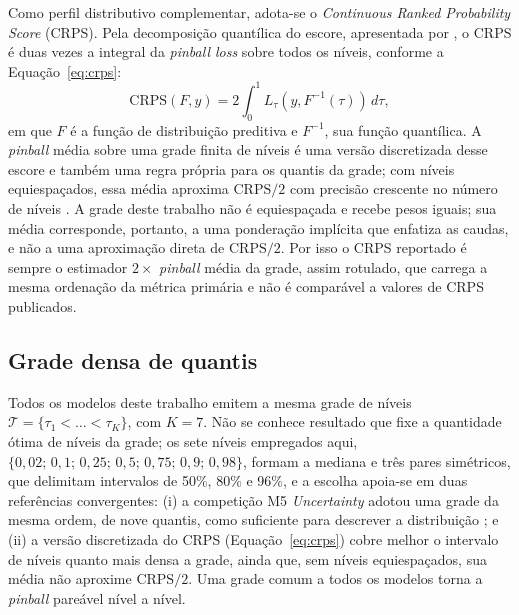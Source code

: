 Como perfil distributivo complementar, adota-se o \textit{Continuous Ranked Probability Score} (CRPS). Pela decomposição quantílica do escore, apresentada por , o CRPS é duas vezes a integral da \textit{pinball loss} sobre todos os níveis, conforme a Equação~\ref{eq:crps}:
\begin{equation}
    \mathrm{CRPS}(F, y) = 2\int_0^1 L_\tau\!\left(y, F^{-1}(\tau)\right)\, d\tau,
    \label{eq:crps}
\end{equation}
em que \(F\) é a função de distribuição preditiva e \(F^{-1}\), sua função quantílica. A \textit{pinball} média sobre uma grade finita de níveis é uma versão discretizada desse escore e também uma regra própria para os quantis da grade; com níveis equiespaçados, essa média aproxima \(\mathrm{CRPS}/2\) com precisão crescente no número de níveis \cite{GNEITINGRANJAN2011}. A grade deste trabalho não é equiespaçada e recebe pesos iguais; sua média corresponde, portanto, a uma ponderação implícita que enfatiza as caudas, e não a uma aproximação direta de \(\mathrm{CRPS}/2\). Por isso o CRPS reportado é sempre o estimador \(2 \times\) \textit{pinball} média da grade, assim rotulado, que carrega a mesma ordenação da métrica primária e não é comparável a valores de CRPS publicados.

\subsection{Grade densa de quantis}\label{sec:grade}
Todos os modelos deste trabalho emitem a mesma grade de níveis \(\mathcal{T}=\{\tau_1<\dots<\tau_K\}\), com \(K = 7\). Não se conhece resultado que fixe a quantidade ótima de níveis da grade; os sete níveis empregados aqui, \(\{0{,}02;\,0{,}1;\,0{,}25;\,0{,}5;\,0{,}75;\,0{,}9;\,0{,}98\}\), formam a mediana e três pares simétricos, que delimitam intervalos de 50\%, 80\% e 96\%, e a escolha apoia-se em duas referências convergentes: (i) a competição M5 \textit{Uncertainty} adotou uma grade da mesma ordem, de nove quantis, como suficiente para descrever a distribuição \cite{MAKRIDAKIS2022}; e (ii) a versão discretizada do CRPS (Equação~\ref{eq:crps}) cobre melhor o intervalo de níveis quanto mais densa a grade, ainda que, sem níveis equiespaçados, sua média não aproxime \(\mathrm{CRPS}/2\). Uma grade comum a todos os modelos torna a \textit{pinball} pareável nível a nível.

